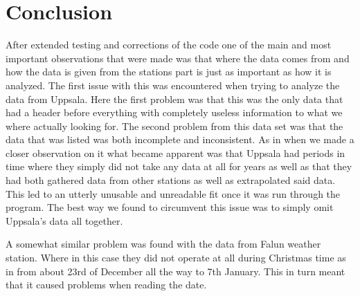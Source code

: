 \section*{Conclusion}
After extended testing and corrections of the code one of the main and most important observations that were made was that where the data comes from and how the data is given from the stations part is just as important as how it is analyzed.
The first issue with this was encountered when trying to analyze the data from Uppsala. Here the first problem was that this was the only data that had a header before everything with completely useless information to what we where actually looking for. The second problem from this data set was that the data that was listed was both incomplete and inconsistent. As in when we made a closer observation on it what became apparent was that Uppsala had periods in time where they simply did not take any data at all for years as well as that they had both gathered data from other stations as well as extrapolated said data. This led to an utterly unusable and unreadable fit once it was run through the program. The best way we found to circumvent this issue was to simply omit Uppsala's data all together. 

A somewhat similar problem was found with the data from Falun weather station. Where in this case they did not operate at all during Christmas time as in from about 23rd of December all the way to 7th January. This in turn meant that it caused problems when reading the date.
 